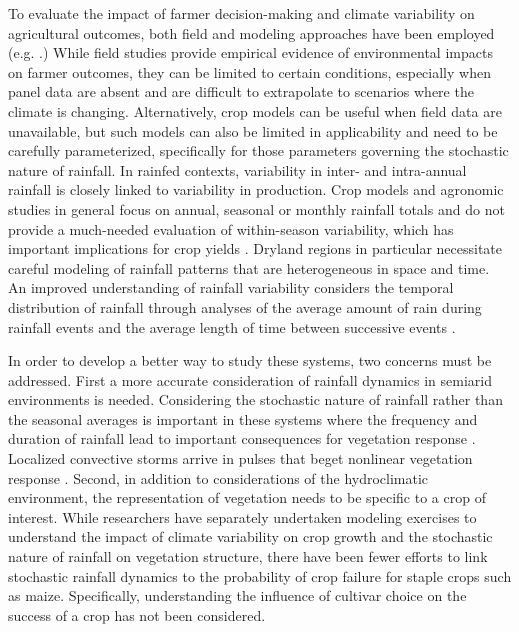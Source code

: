 To evaluate the impact of farmer decision-making and climate variability on agricultural outcomes, both field and modeling approaches have been employed (e.g. .) While field studies provide empirical evidence of environmental impacts on farmer outcomes, they can be limited to certain conditions, especially when panel data are absent \cite{patt2005effects, Hansen2011-bk} and are difficult to extrapolate to scenarios where the climate is changing. Alternatively, crop models can be useful when field data are unavailable, but such models can also be limited in applicability and need to be carefully parameterized, specifically for those parameters governing the stochastic nature of rainfall. In rainfed contexts, variability in inter- and intra-annual rainfall is closely linked to variability in production. Crop models and agronomic studies in general focus on annual, seasonal or monthly rainfall totals \cite{barron2003dry} and do not provide a much-needed evaluation of within-season variability, which has important implications for crop yields \cite{recha2012determination}. Dryland regions in particular necessitate careful modeling of rainfall patterns that are heterogeneous in space and time. An improved understanding of rainfall variability considers the temporal distribution of rainfall through analyses of the average amount of rain during rainfall events and the average length of time between successive events \cite{recha2012determination}.

In order to develop a better way to study these systems, two concerns must be addressed. First a more accurate consideration of rainfall dynamics in semiarid environments is needed. Considering the stochastic nature of rainfall rather than the seasonal averages is important in these systems where the frequency and duration of rainfall lead to important consequences for vegetation response \cite{Katul2007-tj, Porporato2002-uq}. Localized convective storms arrive in pulses that beget nonlinear vegetation response \cite{Katul2007-tj, Baudena2007-tg}. Second, in addition to considerations of the hydroclimatic environment, the representation of vegetation needs to be specific to a crop of interest. While researchers have separately undertaken modeling exercises to understand the impact of climate variability on crop growth and the stochastic nature of rainfall on vegetation structure, there have been fewer efforts to link stochastic rainfall dynamics to the probability of crop failure for staple crops such as maize. Specifically, understanding the influence of cultivar choice on the success of a crop has not been considered.

